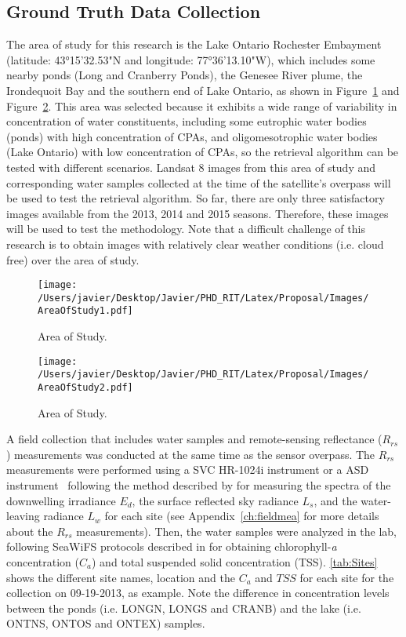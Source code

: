 \subsection{Ground Truth Data Collection}
The area of study for this research is the Lake Ontario Rochester Embayment (latitude: 43°15'32.53"N and longitude: 77°36'13.10"W), which includes some nearby ponds (Long and Cranberry Ponds), the Genesee River plume, the Irondequoit Bay and the southern end of Lake Ontario, as shown in Figure~\ref{fig:areaofstudy1} and Figure~\ref{fig:areaofstudy2}. This area was selected because it exhibits a wide range of variability in concentration of water constituents, including some eutrophic water bodies (ponds) with high concentration of CPAs, and oligomesotrophic water bodies (Lake Ontario) with low concentration of CPAs, so the retrieval algorithm can be tested with different scenarios. Landsat 8 images from this area of study and corresponding water samples collected at the time of the satellite's overpass will be used to test the retrieval algorithm. So far, there are only three satisfactory images available from the 2013, 2014 and 2015 seasons. Therefore, these images will be used to test the methodology. Note that a difficult challenge of this research is to obtain images with relatively clear weather conditions (i.e. cloud free) over the area of study.
\begin{figure}[htb]
  \centering
  \texttt{[image: /Users/javier/Desktop/Javier/PHD\_RIT/Latex/Proposal/Images/AreaOfStudy1.pdf]}
  \caption{Area of Study. \label{fig:areaofstudy1} } 
\end{figure}
\begin{figure}[htb]
  \centering
  \texttt{[image: /Users/javier/Desktop/Javier/PHD\_RIT/Latex/Proposal/Images/AreaOfStudy2.pdf]}
  \caption{Area of Study. \label{fig:areaofstudy2} } 
\end{figure}

A field collection that includes water samples and remote-sensing reflectance ($R_{rs}$) measurements was conducted at the same time as the sensor overpass. The $R_{rs}$ measurements were performed using a SVC HR-1024i instrument \cite{SVCHR1024i} or a ASD instrument~ following the method described by \cite{Mobley:1999} for measuring the spectra of the downwelling irradiance $E_d$, the surface reflected sky radiance $L_s$, and the water-leaving radiance $L_w$ for each site (see Appendix~\ref{ch:fieldmea} for more details about the $R_{rs}$ measurements). Then, the water samples were analyzed in the lab, following SeaWiFS protocols described in \cite{Mueller1995} for obtaining chlorophyll-{\it a} concentration ($C_a$) and total suspended solid concentration (TSS). \autoref{tab:Sites} shows the different site names, location and the $C_a$ and $TSS$ for each site for the collection on 09-19-2013, as example. Note the difference in concentration levels between the ponds (i.e. LONGN, LONGS and CRANB) and the lake (i.e. ONTNS, ONTOS and ONTEX) samples.

